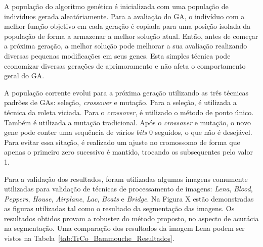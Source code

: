 \documentclass[12pt,oneside,a4paper,english,french,spanish,brazil,]{abntex2}
\begin{document}
A população do algoritmo genético é inicializada com uma população de individuos gerada aleatóriamente. Para a avaliação do GA, o indivíduo com a melhor função objetivo em cada geração é copiada para uma posição isolada da população de forma a armazenar a melhor solução atual. Então, antes de começar a próxima geração, a melhor solução pode melhorar a sua avaliação realizando diversas pequenas modificações em seus genes. Esta simples técnica pode economizar diversas gerações de aprimoramento e não afeta o comportamento geral do GA.

A população corrente evolui para a próxima geração utilizando as três técnicas padrões de GAs: seleção, \textit{crossover} e mutação. Para a seleção, é utilizada a técnica da roleta viciada. Para o \textit{crossover}, é utilizado o método de ponto único. Também é utilizada a mutação tradicional. Após o \textit{crossover} e mutação, o novo gene pode conter uma sequência de vários \textit{bits} 0 seguidos, o que não é desejável. Para evitar essa sitação, é realizado um ajuste no cromossomo de forma que apenas o primeiro zero sucessivo é mantido, trocando os subsequentes pelo valor 1.

Para a validação dos resultados, foram utilizadas algumas imagens comumente utilizadas para validação de técnicas de processamento de imagens: \textit{Lena}, \textit{Blood}, \textit{Peppers}, \textit{House}, \textit{Airplane}, \textit{Lac}, \textit{Boats} e \textit{Bridge}. Na Figura X estão demonstradas as figuras utilizadas tal como o resultado da segmentação das imagens. Os resultados obtidos provam a robustez do método proposto, no aspecto de acurácia na segmentação. Uma comparação dos resultados da imagem Lena podem ser vistos na Tabela~\ref{tab:TrCo_Bammouche_Resultados}.
\end{document}
